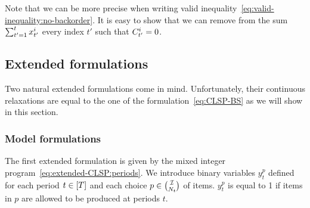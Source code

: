 Note that we can be more precise when writing valid inequality~\eqref{eq:valid-inequality:no-backorder}.
It is easy to show that we can remove from the sum $\sum_{t'=1}^{t}x_{t'}^i$ every index $t'$ such that $C_{t'}^i=0$.





\subsection{Extended formulations}
\label{sec:PDP:deterministic:theoretical-results:extended-formulations}


Two natural extended formulations come in mind.
Unfortunately, their continuous relaxations are equal to the one of the formulation~\eqref{eq:CLSP-BS} as we will show in this section.



\subsubsection{Model formulations}

The first extended formulation is given by the mixed integer program~\eqref{eq:extended-CLSP:periods}.
We introduce binary variables $y_t^p$ defined for each period $t\in\range{\horizon}$ and each choice $p\in{\mathcal{I}\choose N_t}$ of items.
$y_t^p$ is equal to 1 if items in $p$ are allowed to be produced at periods $t$.

